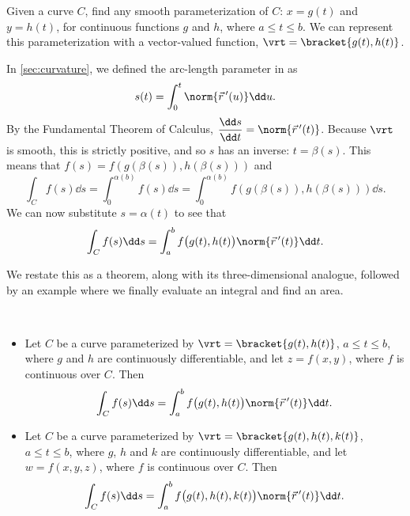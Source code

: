 
Given a curve $C$, find any smooth parameterization of $C$: $x = g(t)$ and $y=h(t)$, for continuous functions $g$ and $h$, where $a\leq t\leq b$. We can represent this parameterization with a vector-valued function, $\vrt =\bracket{g(t),h(t)}$.

In \autoref{sec:curvature}, we defined the arc-length parameter in  as 
\[s(t) = \int_0^t \norm{\vec r\,'(u)}\dd u.\]
By the Fundamental Theorem of Calculus, $\dfrac{\dd s}{\dd t} = \norm{\vec r\,'(t)}$. Because $\vrt$ is smooth, this is strictly positive, and so $s$ has an inverse: $t=\beta(s)$.  This means that $f(s)=f(g(\beta(s)),h(\beta(s)))$ and
%
\[\int_C f(s)\dd s = \int_0^{\alpha(b)} f(s)\dd s = \int_0^{\alpha(b)}f(g(\beta(s)),h(\beta(s)))\dd s. \]
We can now substitute $s=\alpha(t)$ to see that
\[\int_C f(s)\dd s = \int_a^bf\bigl(g(t),h(t)\bigr)\norm{\vec r\,'(t)}\dd t.\]

We restate this as a theorem, along with its three-dimensional analogue, followed by an example where we finally evaluate an integral and find an area.

\begin{theorem}\label{thm:line1}
%
\mbox{}\\[-2\baselineskip]\parbox[t]{\linewidth}{\begin{itemize}
	\item Let $C$ be a curve parameterized by $\vrt =\bracket{g(t),h(t)}$, $a\leq t\leq b$, where $g$ and $h$ are continuously differentiable, and let $z=f(x,y)$, where $f$ is continuous over $C$. Then
\[\int_Cf(s)\dd s = \int_a^bf\bigl(g(t),h(t)\bigr)\norm{\vec r\,'(t)}\dd t.\]
	\item Let $C$ be a curve parameterized by $\vrt =\bracket{g(t),h(t),k(t)}$, $a\leq t\leq b$, where $g$, $h$ and $k$ are continuously differentiable, and let $w=f(x,y,z)$, where $f$ is continuous over $C$. Then
\[\int_Cf(s)\dd s = \int_a^bf\bigl(g(t),h(t),k(t)\bigr)\norm{\vec r\,'(t)}\dd t.\]
\end{itemize}}
\end{theorem}

